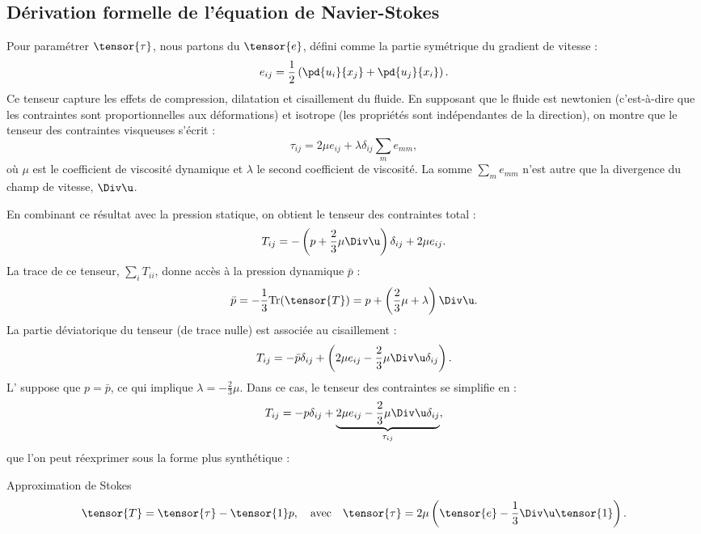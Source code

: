 \begin{redmargin}

\section{Dérivation formelle de l'équation de Navier-Stokes \label{sect:ns}}

Pour paramétrer $\tensor{\tau}$, nous partons du  $\tensor{e}$, défini comme la partie symétrique du gradient de vitesse :
\begin{displaymath}
  e_{ij} = \frac{1}{2}\left( \pd{u_i}{x_j} + \pd{u_j}{x_i} \right).
\end{displaymath}
Ce tenseur capture les effets de compression, dilatation et cisaillement du fluide. En supposant que le fluide est newtonien (c'est-à-dire que les contraintes sont proportionnelles aux déformations) et isotrope (les propriétés sont indépendantes de la direction), on montre que le tenseur des contraintes visqueuses s'écrit :
\begin{displaymath}
  \tau_{ij} = 2 \mu e_{ij} + \lambda \delta_{ij} \sum_{m} e_{mm},
\end{displaymath}
où $\mu$ est le coefficient de viscosité dynamique et $\lambda$ le second coefficient de viscosité. La somme $\sum_{m} e_{mm}$ n'est autre que la divergence du champ de vitesse, $\Div \u$.

En combinant ce résultat avec la pression statique, on obtient le tenseur des contraintes total :
\begin{equation}
  T_{ij} = - \left( p + \frac{2}{3} \mu \Div \u \right) \delta_{ij} + 2\mu e_{ij}.
  \label{eq:stress_tensor}
\end{equation}
La trace de ce tenseur, $\sum_i T_{ii}$, donne accès à la pression dynamique $\bar{p}$ :
\begin{displaymath}
  \bar{p} = -\frac{1}{3} \text{Tr}(\tensor{T}) = p + \left( \frac{2}{3}\mu + \lambda \right) \Div \u.
\end{displaymath}
La partie déviatorique du tenseur (de trace nulle) est associée au cisaillement :
\begin{displaymath}
  T_{ij} = - \bar{p} \delta_{ij} + \left( 2 \mu e_{ij} - \frac{2}{3}\mu \Div \u \delta_{ij} \right).
\end{displaymath}
L' suppose que $p = \bar{p}$, ce qui implique $\lambda = -\frac{2}{3}\mu$. Dans ce cas, le tenseur des contraintes se simplifie en :
\begin{displaymath}
  T_{ij} = - p \delta_{ij} + \underbrace{2\mu e_{ij} - \frac{2}{3}\mu \Div \u \delta_{ij}}_{\tau_{ij}},
\end{displaymath}
que l'on peut réexprimer sous la forme plus synthétique :
\begin{key}{Approximation de Stokes}
\begin{equation}
  \tensor{T} = \tensor{\tau} - \tensor{1}p, \quad\text{avec}\quad \tensor{\tau} = 2\mu \left( \tensor{e} - \frac{1}{3} \Div \u \tensor{1} \right).
  \label{eq:tenseur_contraintes_stokes}
\end{equation}
\end{key}


\end{redmargin}
